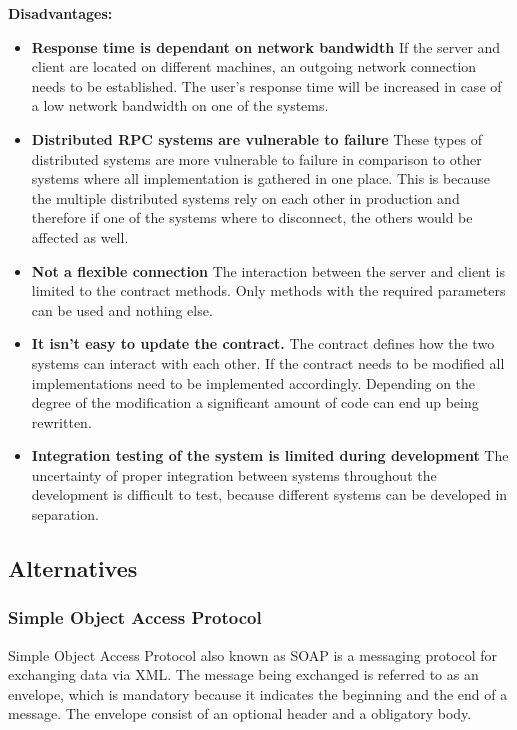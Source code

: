 \documentclass[
]{article}
\begin{document}
\textbf{Disadvantages:}

\begin{itemize}
\item
  \textbf{Response time is dependant on network bandwidth} If the server
  and client are located on different machines, an outgoing network
  connection needs to be established. The user's response time will be
  increased in case of a low network bandwidth on one of the systems.
\item
  \textbf{Distributed RPC systems are vulnerable to failure} These types
  of distributed systems are more vulnerable to failure in comparison to
  other systems where all implementation is gathered in one place. This
  is because the multiple distributed systems rely on each other in
  production and therefore if one of the systems where to disconnect,
  the others would be affected as well.
\item
  \textbf{Not a flexible connection} The interaction between the server
  and client is limited to the contract methods. Only methods with the
  required parameters can be used and nothing else.
\item
  \textbf{It isn't easy to update the contract.} The contract defines
  how the two systems can interact with each other. If the contract
  needs to be modified all implementations need to be implemented
  accordingly. Depending on the degree of the modification a significant
  amount of code can end up being rewritten.
\item
  \textbf{Integration testing of the system is limited during
  development} The uncertainty of proper integration between systems
  throughout the development is difficult to test, because different
  systems can be developed in separation.
\end{itemize}

\hypertarget{alternatives}{%
\subsection{Alternatives}\label{alternatives}}

\hypertarget{simple-object-access-protocol}{%
\subsubsection{Simple Object Access
Protocol}\label{simple-object-access-protocol}}

Simple Object Access Protocol also known as SOAP is a messaging protocol
for exchanging data via XML. The message being exchanged is referred to
as an envelope, which is mandatory because it indicates the beginning
and the end of a message. The envelope consist of an optional header and
a obligatory body.
\end{document}
